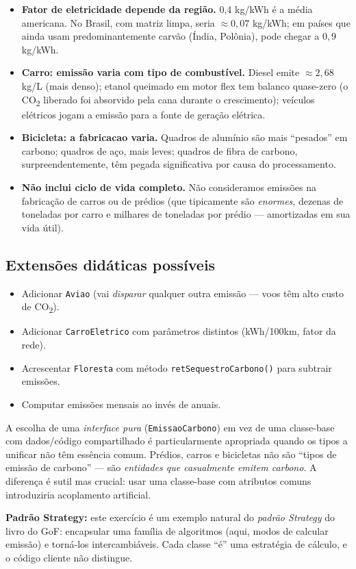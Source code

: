 \documentclass[11pt,a4paper]{article}
\begin{document}
\begin{itemize}[leftmargin=*]
  \item \textbf{Fator de eletricidade depende da regi\~ao.} 0,4 kg/kWh \'e a m\'edia americana. No Brasil, com matriz limpa, seria $\approx 0{,}07$ kg/kWh; em pa\'ises que ainda usam predominantemente carv\~ao (\'India, Pol\^onia), pode chegar a $0{,}9$ kg/kWh.
  \item \textbf{Carro: emiss\~ao varia com tipo de combust\'ivel.} Diesel emite $\approx 2{,}68$ kg/L (mais denso); etanol queimado em motor flex tem balanco quase-zero (o CO\textsubscript{2} liberado foi absorvido pela cana durante o crescimento); ve\'iculos el\'etricos jogam a emiss\~ao para a fonte de gera\c{c}\~ao el\'etrica.
  \item \textbf{Bicicleta: a fabricacao varia.} Quadros de alum\'inio s\~ao mais ``pesados'' em carbono; quadros de a\c{c}o, mais leves; quadros de fibra de carbono, surpreendentemente, t\^em pegada significativa por causa do processamento.
  \item \textbf{N\~ao inclui ciclo de vida completo.} N\~ao consideramos emiss\~oes na fabrica\c{c}\~ao de carros ou de pr\'edios (que tipicamente s\~ao \emph{enormes}, dezenas de toneladas por carro e milhares de toneladas por pr\'edio --- amortizadas em sua vida \'util).
\end{itemize}

\subsection*{Extens\~oes did\'aticas poss\'iveis}

\begin{itemize}[leftmargin=*,itemsep=0pt]
  \item Adicionar \texttt{Aviao} (vai \emph{disparar} qualquer outra emiss\~ao --- voos t\^em alto custo de CO\textsubscript{2}).
  \item Adicionar \texttt{CarroEletrico} com par\^ametros distintos (kWh/100km, fator da rede).
  \item Acrescentar \texttt{Floresta} com m\'etodo \texttt{retSequestroCarbono()} para subtrair emiss\~oes.
  \item Computar emiss\~oes mensais ao inv\'es de anuais.
\end{itemize}

\begin{obseng}
A escolha de uma \emph{interface pura} (\texttt{EmissaoCarbono}) em vez de uma classe-base com dados/c\'odigo compartilhado \'e particularmente apropriada quando os tipos a unificar n\~ao t\^em ess\^encia comum. Pr\'edios, carros e bicicletas n\~ao s\~ao ``tipos de emiss\~ao de carbono'' --- s\~ao \emph{entidades que casualmente emitem carbono}. A diferen\c{c}a \'e sutil mas crucial: usar uma classe-base com atributos comuns introduziria acoplamento artificial.

\smallskip
\textbf{Padr\~ao Strategy:} este exerc\'icio \'e um exemplo natural do \emph{padr\~ao Strategy} do livro do GoF: encapsular uma fam\'ilia de algoritmos (aqui, modos de calcular emiss\~ao) e torn\'a-los intercambi\'aveis. Cada classe ``\'e'' uma estrat\'egia de c\'alculo, e o c\'odigo cliente n\~ao distingue.
\end{obseng}
\end{document}
